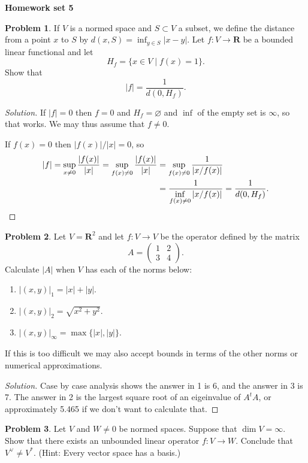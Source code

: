 \documentclass[11pt]{article}
\theoremstyle{definition}
\newtheorem{prob}{Problem}
\newcommand{\kk}[1]{\mathbf{#1}}
\def\head{
\begin{center}
\textbf{\LARGE Homework set 5}
\end{center}
\medskip
}
\begin{document}
\head

\begin{prob}
If $V$ is a normed space and $S \subset V$ a subset, we define the distance from
a point $x$ to $S$ by $d(x, S) = \inf_{y \in S} |x - y|$.
Let $f : V \to \kk R$ be a bounded linear functional and let
\[
H_f = \{ x \in V \mid f(x) = 1 \}.
\]
Show that
\[
|f| = \frac{1}{d(0, H_f)}.
\]
\end{prob}

\begin{proof}[Solution]
If $|f| = 0$ then $f = 0$ and $H_f = \varnothing$ and $\inf$ of the empty set
is $\infty$, so that works.
We may thus assume that $f \not= 0$.

If $f(x) = 0$ then $|f(x)|/|x| = 0$, so
\begin{align*}
|f|
= \sup_{x\not=0} \frac{|f(x)|}{|x|}
= \sup_{f(x)\not=0} \frac{|f(x)|}{|x|}
&= \sup_{f(x)\not=0} \frac{1}{|x/f(x)|}
\\
&= \frac{1}{\inf\limits_{f(x)\not=0} |x/f(x)|}
= \frac{1}{d(0, H_f)}.
\qedhere
\end{align*}
\end{proof}

\begin{prob}
Let $V = \kk R^2$ and let $f : V \to V$ be the operator defined by the matrix
\[
A = \begin{pmatrix}
1 & 2 \\ 3 & 4
\end{pmatrix}.
\]
Calculate $|A|$ when $V$ has each of the norms below:
\begin{enumerate}
\item
$|(x,y)|_1 = |x| + |y|$.

\item
$|(x,y)|_2 = \sqrt{x^2 + y^2}$.

\item
$|(x,y)|_\infty = \max\{|x|, |y|\}$.
\end{enumerate}
If this is too difficult we may also accept bounds in terms of the other norms
or numerical approximations.
\end{prob}

\begin{proof}[Solution]
Case by case analysis shows the answer in 1 is 6, and the answer in 3 is 7.
The answer in 2 is the largest square root of an eigeinvalue of $A^t A$,
or approximately 5.465 if we don't want to calculate that.
\end{proof}

\begin{prob}
Let $V$ and $W \not= 0$ be normed spaces.
Suppose that $\dim V = \infty$.
Show that there exists an unbounded linear operator $f : V \to W$.
Conclude that $V^\vee \not= V^*$.
(Hint: Every vector space has a basis.)
\end{prob}
\end{document}

